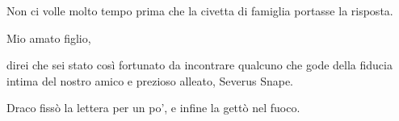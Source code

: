 Non ci volle molto tempo prima che la civetta di famiglia portasse la risposta.

\vspace{1em}
\begin{addmargin}[3em]{3em}%
\begin{itpars}
Mio amato figlio,

direi che sei stato così fortunato da incontrare qualcuno che gode della fiducia intima del nostro amico e prezioso alleato, Severus Snape.
\end{itpars}
\end{addmargin}
\vspace{1em}

Draco fissò la lettera per un po’, e infine la gettò nel fuoco.
